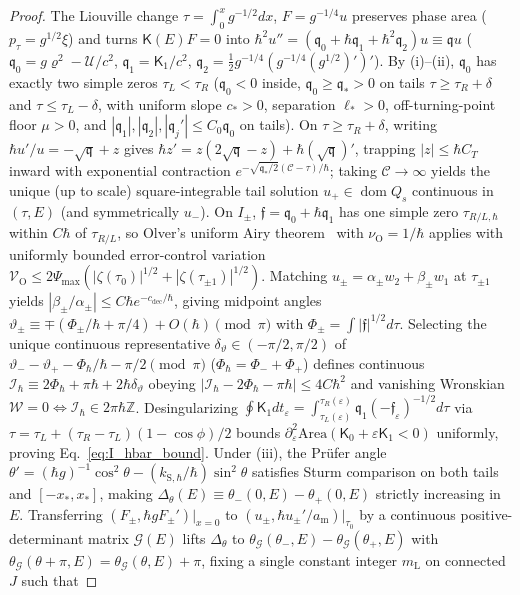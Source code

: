 \documentclass[aps,prd,onecolumn,tightenlines,nofootinbib,notitlepage,10pt,floatfix]{revtex4-2}
\theoremstyle{indentedtheorem}
\begin{document}
\begin{proof}
The Liouville change $\tau=\int_0^x g^{-1/2}dx$, $F=g^{-1/4}u$ preserves phase area ($p_\tau=g^{1/2}\xi$) and turns $\mathsf{K}(E)F=0$ into $\hbar^2 u''=(\mathfrak{q}_0+\hbar\mathfrak{q}_1+\hbar^2\mathfrak{q}_2)u\equiv\mathfrak{q}u$ ($\mathfrak{q}_0=g\varrho^2-\mathcal{U}/c^2$, $\mathfrak{q}_1=\mathsf{K}_1/c^2$, $\mathfrak{q}_2=\tfrac{1}{2}g^{-1/4}(g^{-1/4}(g^{1/2})')'$). By (i)--(ii), $\mathfrak{q}_0$ has exactly two simple zeros $\tau_L<\tau_R$ ($\mathfrak{q}_0<0$ inside, $\mathfrak{q}_0\ge\mathfrak{q}_*>0$ on tails $\tau\ge\tau_R+\delta$ and $\tau\le\tau_L-\delta$, with uniform slope $c_*>0$, separation $\ell_*>0$, off-turning-point floor $\mu>0$, and $|\mathfrak{q}_1|,|\mathfrak{q}_2|,|\mathfrak{q}_j'|\le C_0\mathfrak{q}_0$ on tails). On $\tau\ge\tau_R+\delta$, writing $\hbar u'/u=-\sqrt{\mathfrak{q}}+z$ gives $\hbar z'=z(2\sqrt{\mathfrak{q}}-z)+\hbar(\sqrt{\mathfrak{q}})'$, trapping $|z|\le\hbar C_T$ inward with exponential contraction $e^{-\sqrt{\mathfrak{q}_*/2}(\mathcal{C}-\tau)/\hbar}$; taking $\mathcal{C}\to\infty$ yields the unique (up to scale) square-integrable tail solution $u_+\in\operatorname{dom}Q_s$ continuous in $(\tau,E)$ (and symmetrically $u_-$). On $I_\pm$, $\mathfrak{f}=\mathfrak{q}_0+\hbar\mathfrak{q}_1$ has one simple zero $\tau_{R/L,\hbar}$ within $C\hbar$ of $\tau_{R/L}$, so Olver's uniform Airy theorem~\citep[Ch.~11, Thm.~3.1]{Olver1974Asymptotics} with $\nu_\text{O}=1/\hbar$ applies with uniformly bounded error-control variation $\mathcal{V}_\text{O}\le 2\Psi_{\max}(|\zeta(\tau_0)|^{1/2}+|\zeta(\tau_{\pm 1})|^{1/2})$. Matching $u_\pm=\alpha_\pm w_2+\beta_\pm w_1$ at $\tau_{\pm 1}$ yields $|\beta_\pm/\alpha_\pm|\le C\hbar e^{-c_\text{dec}/\hbar}$, giving midpoint angles $\vartheta_\pm\equiv\mp(\Phi_\pm/\hbar+\pi/4)+O(\hbar)\pmod{\pi}$ with $\Phi_\pm=\int|\mathfrak{f}|^{1/2}d\tau$. Selecting the unique continuous representative $\delta_\vartheta\in(-\pi/2,\pi/2)$ of $\vartheta_--\vartheta_+-\Phi_\hbar/\hbar-\pi/2\pmod{\pi}$ ($\Phi_\hbar=\Phi_-+\Phi_+$) defines continuous $\mathcal{I}_\hbar\equiv 2\Phi_\hbar+\pi\hbar+2\hbar\delta_\vartheta$ obeying $|\mathcal{I}_\hbar-2\Phi_\hbar-\pi\hbar|\le 4C\hbar^2$ and vanishing Wronskian $\mathcal{W}=0\iff\mathcal{I}_\hbar\in 2\pi\hbar\mathbb{Z}$. Desingularizing $\oint\mathsf{K}_1 dt_\varepsilon=\int_{\tau_L(\varepsilon)}^{\tau_R(\varepsilon)}\mathfrak{q}_1(-\mathfrak{f}_\varepsilon)^{-1/2}d\tau$ via $\tau=\tau_L+(\tau_R-\tau_L)(1-\cos\phi)/2$ bounds $\partial_\varepsilon^2\text{Area}(\mathsf{K}_0+\varepsilon\mathsf{K}_1<0)$ uniformly, proving Eq.~\eqref{eq:I_hbar_bound}. Under (iii), the Pr\"ufer angle $\theta'=(\hbar g)^{-1}\cos^2\theta-(k_{\text{S},\hbar}/\hbar)\sin^2\theta$ satisfies Sturm comparison on both tails and $[-x_*,x_*]$, making $\Delta_\theta(E)\equiv\theta_-(0,E)-\theta_+(0,E)$ strictly increasing in $E$. Transferring $(F_\pm,\hbar gF_\pm')|_{x=0}$ to $(u_\pm,\hbar u_\pm'/a_\text{m})|_{\tau_0}$ by a continuous positive-determinant matrix $\mathcal{G}(E)$ lifts $\Delta_\theta$ to $\theta_\mathcal{G}(\theta_-,E)-\theta_\mathcal{G}(\theta_+,E)$ with $\theta_\mathcal{G}(\theta+\pi,E)=\theta_\mathcal{G}(\theta,E)+\pi$, fixing a single constant integer $m_\text{L}$ on connected $J$ such that 
\end{proof}
\end{document}

